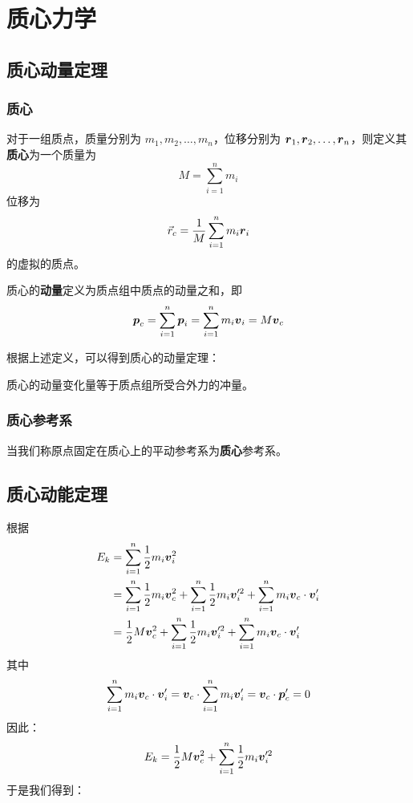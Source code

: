 \section{质心力学}

\subsection{质心动量定理}

\subsubsection{质心}

\begin{definition}
    对于一组质点，质量分别为 $m_1, m_2,\dots, m_n$，位移分别为 $\boldsymbol{r}_1, \boldsymbol{r}_2, \dots, \boldsymbol{r}_n$，则定义其\textbf{质心}为一个质量为
    $$
    M = \sum_{i=1}^n m_i
    $$
    位移为
    $$
    \vec{r}_c = \frac{1}{M} \sum_{i=1}^n m_i \boldsymbol{r}_i
    $$
    的虚拟的质点。
\end{definition}

\begin{definition}
    质心的\textbf{动量}定义为质点组中质点的动量之和，即
    $$
    \boldsymbol{p}_c = \sum_{i=1}^n \boldsymbol{p}_i = \sum_{i=1}^n m_i \boldsymbol{v}_i = M \boldsymbol{v}_c
    $$
\end{definition}

根据上述定义，可以得到质心的动量定理：

\begin{theorem}
    质心的动量变化量等于质点组所受合外力的冲量。
\end{theorem}

\subsubsection{质心参考系}

当我们称原点固定在质心上的平动参考系为\textbf{质心}参考系。

\subsection{质心动能定理}

根据
$$
\begin{aligned}
    E_k & = \sum_{i=1}^n \frac{1}{2} m_i \boldsymbol{v}_i^2 \\
    & = \sum_{i=1}^n \frac{1}{2} m_i \boldsymbol{v}_c^2 + \sum_{i=1}^n \frac{1}{2} m_i \boldsymbol{v}_i'^2 + \sum_{i=1}^n m_i \boldsymbol{v}_c \cdot \boldsymbol{v}_i' \\
    & = \frac{1}{2} M \boldsymbol{v}_c^2 + \sum_{i=1}^n \frac{1}{2} m_i \boldsymbol{v}_i'^2 + \sum_{i=1}^n m_i \boldsymbol{v}_c \cdot \boldsymbol{v}_i'
\end{aligned}
$$
其中
$$
\begin{aligned}
    \sum_{i=1}^n m_i \boldsymbol{v}_c \cdot \boldsymbol{v}_i' = \boldsymbol{v}_c \cdot \sum_{i=1}^n m_i \boldsymbol{v}_i' = \boldsymbol{v}_c \cdot \boldsymbol{p}_c' = 0
\end{aligned}
$$
因此：
$$
E_k = \frac{1}{2} M \boldsymbol{v}_c^2 + \sum_{i=1}^n \frac{1}{2} m_i \boldsymbol{v}_i'^2
$$
于是我们得到：


